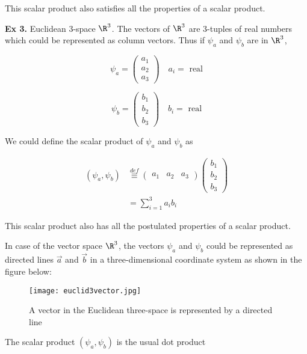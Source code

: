 \begin{description}
This scalar product also satisfies all the properties of a scalar product.



\item {\bf Ex 3.} Euclidean 3-space $\R^3$. The vectors of $\R^3$ are 3-tuples of real numbers which could be represented as column vectors. Thus if $\psi_a$ and $\psi_b$ are in $\R^3$,

$$\psi_a = 
\begin{pmatrix}
    a_1 \\
    a_2 \\
    a_3
\end{pmatrix} \quad a_i = \text{ real}
$$

$$\psi_b = 
\begin{pmatrix}
    b_1 \\
    b_2 \\
    b_3
\end{pmatrix} \quad b_i = \text{ real}
$$

We could define the scalar product of $\psi_a$ and $\psi_b$ as

\begin{align*}
(\psi_a,\psi_b) & \stackrel{def}{\equiv}
\begin{pmatrix}
    a_1 & a_2 & a_3
\end{pmatrix}
\begin{pmatrix}
    b_1 \\
    b_2 \\
    b_3
\end{pmatrix}  \\
               & = \sum_{i=1}^{3} a_i b_i
\end{align*}

This scalar product also has all the postulated properties of a scalar product.
\end{description}






In case of the vector space $\R^3$, the vectors $\psi_a$ and $\psi_b$ could be represented as directed lines $\vec{a}$ and $\vec{b}$ in a three-dimensional coordinate system as shown in the figure below:
\begin{figure}[ht]
\centering
\texttt{[image: euclid3vector.jpg]}
\caption{A vector in the Euclidean three-space is represented by a directed line}
\end{figure}

\begin{flushleft}
The scalar product $(\psi_a,\psi_b)$ is the usual dot product
\end{flushleft}

